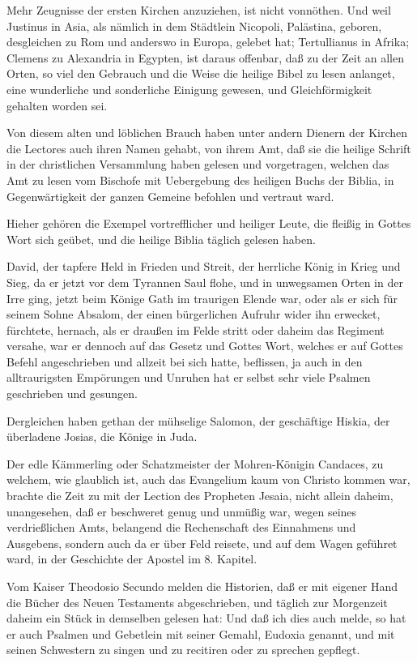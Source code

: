 Mehr Zeugnisse der ersten Kirchen anzuziehen, ist nicht vonnöthen. Und weil Justinus in Asia, als nämlich in dem Städtlein Nicopoli, Palästina, geboren, desgleichen zu Rom und anderswo in Europa, gelebet hat; Tertullianus in Afrika; Clemens zu Alexandria in Egypten, ist daraus offenbar, daß zu der Zeit an allen Orten, so viel den Gebrauch und die Weise die heilige Bibel zu lesen anlanget, eine wunderliche und sonderliche Einigung gewesen, und Gleichförmigkeit gehalten worden sei.

Von diesem alten und löblichen Brauch haben unter andern Dienern der Kirchen die Lectores auch ihren Namen gehabt, von ihrem Amt, daß sie die heilige Schrift in der christlichen Versammlung haben gelesen und vorgetragen, welchen das Amt zu lesen vom Bischofe mit Uebergebung des heiligen Buchs der Biblia, in Gegenwärtigkeit der ganzen Gemeine befohlen und vertraut ward.

Hieher gehören die Exempel vortrefflicher und heiliger Leute, die fleißig in Gottes Wort sich geübet, und die heilige Biblia täglich gelesen haben.

David, der tapfere Held in Frieden und Streit, der herrliche König in Krieg und Sieg, da er jetzt vor dem Tyrannen Saul flohe, und in unwegsamen Orten in der Irre ging, jetzt beim Könige Gath im traurigen Elende war, oder als er sich für seinem Sohne Absalom, der einen bürgerlichen Aufruhr wider ihn erwecket, fürchtete, hernach, als er draußen im Felde stritt oder daheim das Regiment versahe, war er dennoch auf das Gesetz und Gottes Wort, welches er auf Gottes Befehl angeschrieben und allzeit bei sich hatte, beflissen, ja auch in den alltraurigsten Empörungen und Unruhen hat er selbst sehr viele Psalmen geschrieben und gesungen.

Dergleichen haben gethan der mühselige Salomon, der geschäftige Hiskia, der überladene Josias, die Könige in Juda.

Der edle Kämmerling oder Schatzmeister der Mohren-Königin Candaces, zu welchem, wie glaublich ist, auch das Evangelium kaum von Christo kommen war, brachte die Zeit zu mit der Lection des Propheten Jesaia, nicht allein daheim, unangesehen, daß er beschweret genug und unmüßig war, wegen seines verdrießlichen Amts, belangend die Rechenschaft des Einnahmens und Ausgebens, sondern auch da er über Feld reisete, und auf dem Wagen geführet ward, in der Geschichte der Apostel im 8. Kapitel.

Vom Kaiser Theodosio Secundo melden die Historien, daß er mit eigener Hand die Bücher des Neuen Testaments abgeschrieben, und täglich zur Morgenzeit daheim ein Stück in demselben gelesen hat: Und daß ich dies auch melde, so hat er auch Psalmen und Gebetlein mit seiner Gemahl, Eudoxia genannt, und mit seinen Schwestern zu singen und zu recitiren oder zu sprechen gepflegt.

